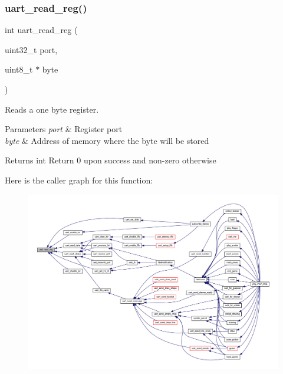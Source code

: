 \mbox{\label{group__uart_ga072a4cc00030540e86ac100c8e7c8902}} 
\subsubsection{\texorpdfstring{uart\+\_\+read\+\_\+reg()}{uart\_read\_reg()}}
{\footnotesize\ttfamily int uart\+\_\+read\+\_\+reg (\begin{DoxyParamCaption}\item[{uint32\+\_\+t}]{port,  }\item[{uint8\+\_\+t $\ast$}]{byte }\end{DoxyParamCaption})}



Reads a one byte register. 


\begin{DoxyParams}{Parameters}
{\em port} & Register port \\
\hline
{\em byte} & Address of memory where the byte will be stored \\
\hline
\end{DoxyParams}
\begin{DoxyReturn}{Returns}
int Return 0 upon success and non-\/zero otherwise 
\end{DoxyReturn}
Here is the caller graph for this function\+:\nopagebreak
\begin{figure}[H]
\begin{center}
\leavevmode
\includegraphics[width=350pt]{group__uart_ga072a4cc00030540e86ac100c8e7c8902_icgraph}
\end{center}
\end{figure}
\mbox{\label{group__uart_ga2489cf587ed0d39db2aafebba69d6b6d}} 
